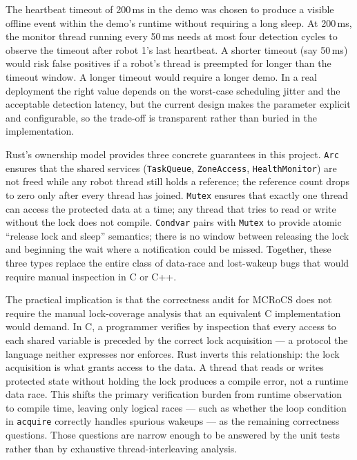 \documentclass[11pt]{article}
\begin{document}
The heartbeat timeout of 200\,ms in the demo was chosen to produce a visible offline event within the demo's runtime without requiring a long sleep. At 200\,ms, the monitor thread running every 50\,ms needs at most four detection cycles to observe the timeout after robot 1's last heartbeat. A shorter timeout (say 50\,ms) would risk false positives if a robot's thread is preempted for longer than the timeout window. A longer timeout would require a longer demo. In a real deployment the right value depends on the worst-case scheduling jitter and the acceptable detection latency, but the current design makes the parameter explicit and configurable, so the trade-off is transparent rather than buried in the implementation.

Rust's ownership model provides three concrete guarantees in this project. \texttt{Arc} ensures that the shared services (\texttt{TaskQueue}, \texttt{ZoneAccess}, \texttt{HealthMonitor}) are not freed while any robot thread still holds a reference; the reference count drops to zero only after every thread has joined. \texttt{Mutex} ensures that exactly one thread can access the protected data at a time; any thread that tries to read or write without the lock does not compile. \texttt{Condvar} pairs with \texttt{Mutex} to provide atomic ``release lock and sleep'' semantics; there is no window between releasing the lock and beginning the wait where a notification could be missed. Together, these three types replace the entire class of data-race and lost-wakeup bugs that would require manual inspection in C or C++.

The practical implication is that the correctness audit for MCRoCS does not require the manual lock-coverage analysis that an equivalent C implementation would demand. In C, a programmer verifies by inspection that every access to each shared variable is preceded by the correct lock acquisition --- a protocol the language neither expresses nor enforces. Rust inverts this relationship: the lock acquisition is what grants access to the data. A thread that reads or writes protected state without holding the lock produces a compile error, not a runtime data race. This shifts the primary verification burden from runtime observation to compile time, leaving only logical races --- such as whether the loop condition in \texttt{acquire} correctly handles spurious wakeups --- as the remaining correctness questions. Those questions are narrow enough to be answered by the unit tests rather than by exhaustive thread-interleaving analysis.
\end{document}
